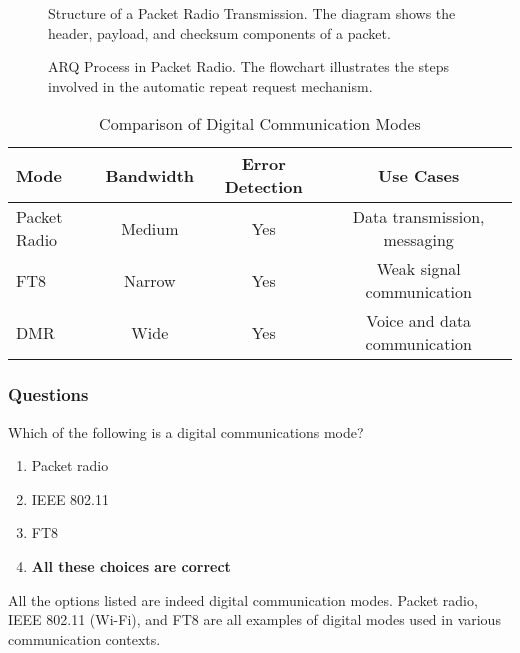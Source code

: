 \begin{figure}[htbp]
    \centering
    \caption{Structure of a Packet Radio Transmission. The diagram shows the header, payload, and checksum components of a packet.}
    \label{fig:packet-structure}
\end{figure}

\begin{figure}[htbp]
    \centering
    \caption{ARQ Process in Packet Radio. The flowchart illustrates the steps involved in the automatic repeat request mechanism.}
    \label{fig:arq-process}
\end{figure}

\begin{table}[htbp]
    \centering
    \caption{Comparison of Digital Communication Modes}
    \label{tab:digital-mode-comparison}
    \begin{tabular}{|l|c|c|c|}
        \hline
        \textbf{Mode} & \textbf{Bandwidth} & \textbf{Error Detection} & \textbf{Use Cases} \\
        \hline
        Packet Radio & Medium & Yes & Data transmission, messaging \\
        FT8 & Narrow & Yes & Weak signal communication \\
        DMR & Wide & Yes & Voice and data communication \\
        \hline
    \end{tabular}
\end{table}

\subsubsection{Questions}

\begin{tcolorbox}[colback=gray!10!white,colframe=black!75!black,title={T8D01}]
    Which of the following is a digital communications mode?
    \begin{enumerate}[label=\Alph*),noitemsep]
        \item Packet radio
        \item IEEE 802.11
        \item FT8
        \item \textbf{All these choices are correct}
    \end{enumerate}
\end{tcolorbox}
All the options listed are indeed digital communication modes. Packet radio, IEEE 802.11 (Wi-Fi), and FT8 are all examples of digital modes used in various communication contexts.

